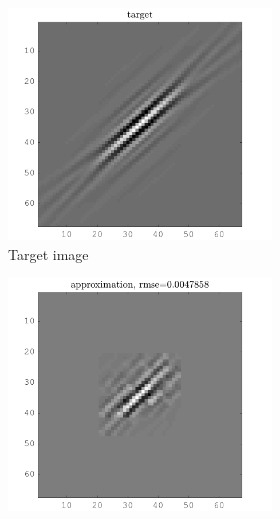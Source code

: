 \begin{figure}[!h]\centering
\begin{subfigure}[b]{0.99\textwidth}\centering
	\begin{subfigure}[b]{0.32\textwidth}\centering
	\includegraphics[width=\textwidth]{figures/before_after/xp_128x128_sc2_angl1_K3_S3_node4before_target.png}
		\caption{Target image}
	\end{subfigure}
	\begin{subfigure}[b]{0.32\textwidth}\centering
	\includegraphics[width=\textwidth]{figures/before_after/xp_128x128_sc2_angl1_K3_S3_node4before_approx.png}

\end{subfigure}
\end{subfigure}
\end{figure}
